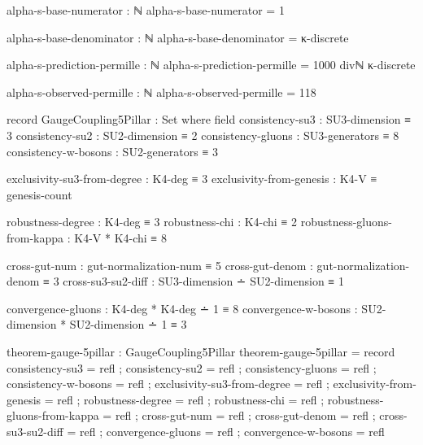 \documentclass[11pt,a4paper]{book}
\begin{document}
\begin{code}
alpha-s-base-numerator : ℕ
alpha-s-base-numerator = 1

alpha-s-base-denominator : ℕ
alpha-s-base-denominator = κ-discrete

alpha-s-prediction-permille : ℕ
alpha-s-prediction-permille = 1000 divℕ κ-discrete
\end{code}

\begin{code}
alpha-s-observed-permille : ℕ
alpha-s-observed-permille = 118


record GaugeCoupling5Pillar : Set where
  field
    consistency-su3 : SU3-dimension ≡ 3
    consistency-su2 : SU2-dimension ≡ 2
    consistency-gluons : SU3-generators ≡ 8
    consistency-w-bosons : SU2-generators ≡ 3
    
    exclusivity-su3-from-degree : K4-deg ≡ 3
    exclusivity-from-genesis    : K4-V ≡ genesis-count
    
    robustness-degree : K4-deg ≡ 3
    robustness-chi : K4-chi ≡ 2
    robustness-gluons-from-kappa : K4-V * K4-chi ≡ 8
    
    cross-gut-num : gut-normalization-num ≡ 5
    cross-gut-denom : gut-normalization-denom ≡ 3
    cross-su3-su2-diff : SU3-dimension ∸ SU2-dimension ≡ 1
    
    convergence-gluons : K4-deg * K4-deg ∸ 1 ≡ 8
    convergence-w-bosons : SU2-dimension * SU2-dimension ∸ 1 ≡ 3

theorem-gauge-5pillar : GaugeCoupling5Pillar
theorem-gauge-5pillar = record
  { consistency-su3 = refl
  ; consistency-su2 = refl
  ; consistency-gluons = refl
  ; consistency-w-bosons = refl
  ; exclusivity-su3-from-degree = refl
  ; exclusivity-from-genesis = refl
  ; robustness-degree = refl
  ; robustness-chi = refl
  ; robustness-gluons-from-kappa = refl
  ; cross-gut-num = refl
  ; cross-gut-denom = refl
  ; cross-su3-su2-diff = refl
  ; convergence-gluons = refl
  ; convergence-w-bosons = refl
  }
\end{code}
\end{document}
